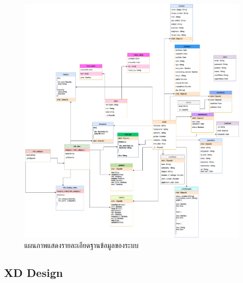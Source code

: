 %
  \begin{figure}
    \begin{center}
    \includegraphics[width=\linewidth]{images/NurseryDiagram.png}
    \end{center}
  \caption{แผนภาพแสดงรายละเอียดฐานข้อมูลของระบบ}
  \label{fig:DatabaseDiagram}
\end{figure}

\subsection{XD Design}

